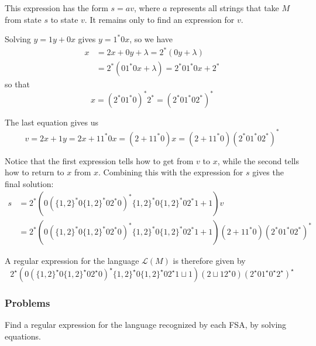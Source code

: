 \documentclass{article}
\newcommand{\El}{\mathcal L}
\begin{document}
This expression has the form $s = av$, where $a$ represents all strings that take $M$ from state $s$ to state $v$. It remains only to find an expression for $v$.

Solving $y = 1y + 0x$ gives $y = 1^* 0x$, so we have
\begin{align*}
x & = 2x + 0y + \lambda = 2^* (0y + \lambda) \\
  & = 2^* (01^* 0x + \lambda) = 2^* 01^* 0x + 2^*
\end{align*}
so that
\begin{equation*}
x = (2^* 01^* 0)^* 2^* = (2^* 01^* 02^*)^*
\end{equation*}

The last equation gives us
\begin{equation*}
v = 2x + 1y = 2x + 11^* 0x = (2 + 11^* 0) x = (2 + 11^* 0) (2^* 01^* 02^*)^*
\end{equation*}

Notice that the first expression tells how to get from $v$ to $x$, while the second tells how to return to $x$ from $x$. Combining this with the expression for $s$ gives the final solution:
\begin{align*}
s & = 2^* (0 (\{1,2\}^* 0 \{1,2\}^* 02^* 0)^* \{1,2\}^* 0 \{1,2\}^* 02^* 1+1) v \\
  & = 2^* (0 (\{1,2\}^* 0 \{1,2\}^* 02^* 0)^* \{1,2\}^* 0 \{1,2\}^* 02^* 1+1) (2+11^* 0) (2^* 01^* 02^*)^*
\end{align*}

A regular expression for the language $\El(M)$ is therefore given by
\begin{equation*}
2^\star (0 (\{1,2\}^\star 0 \{1,2\}^\star 02^\star 0)^\star \{1,2\}^\star 0 \{1,2\}^\star 02^\star 1 \sqcup 1) (2 \sqcup 12^\star 0) (2^\star 01^\star 0^\star 2^\star)^\star
\end{equation*}


\subsubsection*{Problems}

Find a regular expression for the language recognized by each FSA, by solving equations.
\end{document}
